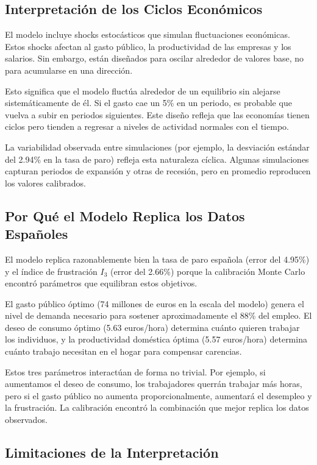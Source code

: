 \subsection{Interpretación de los Ciclos Económicos}

El modelo incluye shocks estocásticos que simulan fluctuaciones económicas. Estos shocks afectan al gasto público, la productividad de las empresas y los salarios. Sin embargo, están diseñados para oscilar alrededor de valores base, no para acumularse en una dirección.

Esto significa que el modelo fluctúa alrededor de un equilibrio sin alejarse sistemáticamente de él. Si el gasto cae un 5\% en un periodo, es probable que vuelva a subir en periodos siguientes. Este diseño refleja que las economías tienen ciclos pero tienden a regresar a niveles de actividad normales con el tiempo.

La variabilidad observada entre simulaciones (por ejemplo, la desviación estándar del 2.94\% en la tasa de paro) refleja esta naturaleza cíclica. Algunas simulaciones capturan periodos de expansión y otras de recesión, pero en promedio reproducen los valores calibrados.

\subsection{Por Qué el Modelo Replica los Datos Españoles}

El modelo replica razonablemente bien la tasa de paro española (error del 4.95\%) y el índice de frustración $I_3$ (error del 2.66\%) porque la calibración Monte Carlo encontró parámetros que equilibran estos objetivos.

El gasto público óptimo (74 millones de euros en la escala del modelo) genera el nivel de demanda necesario para sostener aproximadamente el 88\% del empleo. El deseo de consumo óptimo (5.63 euros/hora) determina cuánto quieren trabajar los individuos, y la productividad doméstica óptima (5.57 euros/hora) determina cuánto trabajo necesitan en el hogar para compensar carencias.

Estos tres parámetros interactúan de forma no trivial. Por ejemplo, si aumentamos el deseo de consumo, los trabajadores querrán trabajar más horas, pero si el gasto público no aumenta proporcionalmente, aumentará el desempleo y la frustración. La calibración encontró la combinación que mejor replica los datos observados.

\subsection{Limitaciones de la Interpretación}

